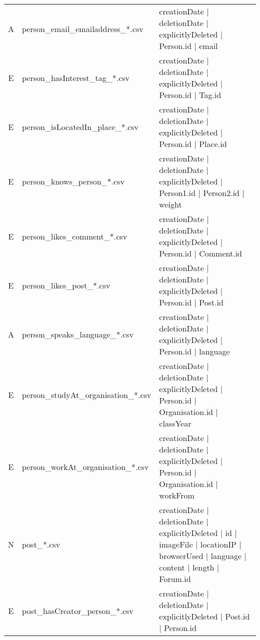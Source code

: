 \begin{table}[htb]
\begin{tabular}{|c|l|l|}
        A                    & person\_email\_emailaddress\_*.csv      & creationDate | deletionDate | explicitlyDeleted | Person.id | email                                                                  \\
        E                    & person\_hasInterest\_tag\_*.csv         & creationDate | deletionDate | explicitlyDeleted | Person.id | Tag.id                                                                 \\
        E                    & person\_isLocatedIn\_place\_*.csv       & creationDate | deletionDate | explicitlyDeleted | Person.id | Place.id                                                               \\
        E                    & person\_knows\_person\_*.csv            & creationDate | deletionDate | explicitlyDeleted | Person1.id | Person2.id | weight                                                   \\
        E                    & person\_likes\_comment\_*.csv           & creationDate | deletionDate | explicitlyDeleted | Person.id | Comment.id                                                             \\
        E                    & person\_likes\_post\_*.csv              & creationDate | deletionDate | explicitlyDeleted | Person.id | Post.id                                                                \\
        A                    & person\_speaks\_language\_*.csv         & creationDate | deletionDate | explicitlyDeleted | Person.id | language                                                               \\
        E                    & person\_studyAt\_organisation\_*.csv    & creationDate | deletionDate | explicitlyDeleted | Person.id | Organisation.id | classYear                                            \\
        E                    & person\_workAt\_organisation\_*.csv     & creationDate | deletionDate | explicitlyDeleted | Person.id | Organisation.id | workFrom                                             \\
        \hline
        N                    & post\_*.csv                             & creationDate | deletionDate | explicitlyDeleted | id | imageFile | locationIP | browserUsed | language | content | length | Forum.id \\
        E                    & post\_hasCreator\_person\_*.csv         & creationDate | deletionDate | explicitlyDeleted | Post.id | Person.id                                                                \\

\end{tabular}
\end{table}
